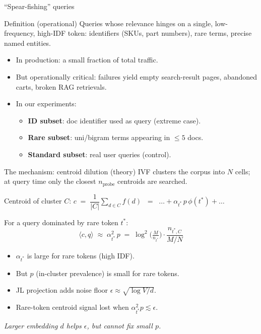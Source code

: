 \documentclass[10pt,aspectratio=169]{beamer}
\begin{document}
\begin{frame}{``Spear-fishing'' queries}
  \begin{block}{Definition (operational)}
    Queries whose relevance hinges on a single, low-frequency, high-IDF token:
    identifiers (SKUs, part numbers), rare terms, precise named entities.
  \end{block}

  \begin{itemize}
    \item In production: a small fraction of total traffic.
    \item But operationally critical: failures yield empty search-result pages,
          abandoned carts, broken RAG retrievals.
    \item In our experiments:
      \begin{itemize}
        \item \textbf{ID subset}: doc identifier used as query (extreme case).
        \item \textbf{Rare subset}: uni/bigram terms appearing in $\le 5$ docs.
        \item \textbf{Standard subset}: real user queries (control).
      \end{itemize}
  \end{itemize}
\end{frame}

\begin{frame}{The mechanism: centroid dilution (theory)}
  IVF clusters the corpus into $N$ cells; at query time only the closest $n_{\text{probe}}$
  centroids are searched.

  \vspace{0.4em}
  Centroid of cluster $C$:\quad
  $c \;=\; \dfrac{1}{|C|}\sum_{d\in C} f(d) \;\;=\;\; \dots + \alpha_{t^*}\,p\,\phi(t^*) + \dots$

  \vspace{0.4em}
  For a query dominated by rare token $t^*$:
  \begin{equation*}
    \langle c, q\rangle \;\approx\; \alpha_{t^*}^2 \, p
      \;=\; \log^2\!\Big(\tfrac{M}{n_{t^*}}\Big)\cdot\frac{n_{t^*,C}}{M/N}
  \end{equation*}

  \vspace{0.3em}
  \begin{itemize}
    \item $\alpha_{t^*}$ is large for rare tokens (high IDF).
    \item But $p$ (in-cluster prevalence) is small for rare tokens.
    \item JL projection adds noise floor $\epsilon \approx \sqrt{\log V / d}$.
    \item \alert{Rare-token centroid signal lost when $\alpha_{t^*}^2 p \lesssim \epsilon$.}
  \end{itemize}

  \medskip
  \emph{Larger embedding $d$ helps $\epsilon$, but cannot fix small $p$.}
\end{frame}
\end{document}
